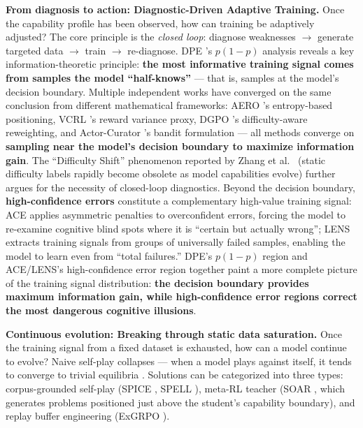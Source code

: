 \noindent
\textbf{From diagnosis to action: Diagnostic-Driven Adaptive Training.}
Once the capability profile has been observed, how can training be adaptively adjusted?
The core principle is the \textit{closed loop}:
diagnose weaknesses $\rightarrow$ generate targeted data $\rightarrow$ train $\rightarrow$ re-diagnose.
DPE \cite{jia2026dpe}'s $p(1-p)$ analysis reveals a key information-theoretic principle:
\textbf{the most informative training signal comes from samples the model ``half-knows''} ---
that is, samples at the model's decision boundary.
Multiple independent works have converged on the same conclusion from different mathematical frameworks:
AERO \cite{gao2026aero}'s entropy-based positioning,
VCRL \cite{jiang2025vcrl}'s reward variance proxy,
DGPO \cite{dai2026dgpo}'s difficulty-aware reweighting,
and Actor-Curator \cite{gu2026actorcurator}'s bandit formulation ---
all methods converge on \textbf{sampling near the model's decision boundary to maximize information gain}.
The ``Difficulty Shift'' phenomenon reported by Zhang et al.\ \cite{zhang2025adcl}
(static difficulty labels rapidly become obsolete as model capabilities evolve)
further argues for the necessity of closed-loop diagnostics.
Beyond the decision boundary, \textbf{high-confidence errors} constitute a complementary high-value training signal:
ACE \cite{ace2026} applies asymmetric penalties to overconfident errors,
forcing the model to re-examine cognitive blind spots where it is ``certain but actually wrong'';
LENS \cite{feng2025lens} extracts training signals from groups of universally failed samples,
enabling the model to learn even from ``total failures.''
DPE's $p(1-p)$ region and ACE/LENS's high-confidence error region
together paint a more complete picture of the training signal distribution:
\textbf{the decision boundary provides maximum information gain,
while high-confidence error regions correct the most dangerous cognitive illusions}.

\noindent
\textbf{Continuous evolution: Breaking through static data saturation.}
Once the training signal from a fixed dataset is exhausted, how can a model continue to evolve?
Naive self-play collapses ---
when a model plays against itself, it tends to converge to trivial equilibria
\cite{liu2026selfplayinfo,sheikh2025srt,yi2025collapse}.
Solutions can be categorized into three types:
corpus-grounded self-play (SPICE \cite{liu2025spice}, SPELL \cite{yang2025spell}),
meta-RL teacher (SOAR \cite{sundaram2026soar}, which generates problems positioned just above the student's capability boundary),
and replay buffer engineering (ExGRPO \cite{zhan2025exgrpo}).

